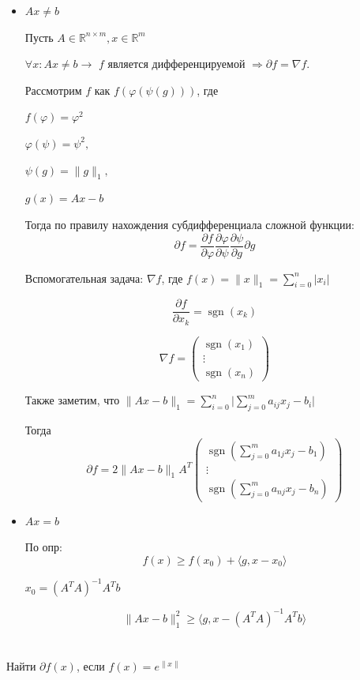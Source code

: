 \documentclass[a4paper,12pt]{article}
\DeclareMathOperator{\sgn}{\mathop{sgn}}
\newcommand{\lt}{\left}
\newcommand{\rt}{\right}
\newcommand{\p}{\partial}
\newcommand{\fr}{\frac}
\newcommand{\bb}{\mathbb}
\newcommand{\vp}{\varphi}
\begin{document}
\begin{itemize}
	
\item $Ax \neq b$

Пусть $A \in \bb R^{n\times m}, x \in \bb R^m$

$\forall x: Ax \neq b \rightarrow$ $f$ является дифференцируемой $\Rightarrow\p f = \nabla f$.

Рассмотрим $f$ как $f(\vp(\psi(g)))$, где 

$f(\vp) = \vp^2$

$\vp(\psi) = \psi^2,$
 
$\psi(g) = \|g\|_1,$ 

$g(x) = Ax-b$

Тогда по правилу нахождения субдифференциала сложной функции:
$$\p f = \fr{\p f}{\p \vp}\fr{\p \vp}{\p \psi}\fr{\p \psi}{\p g}\p g$$

Вспомогательная задача: $\nabla f$, где $f(x) = \|x\|_1 = \sum\limits_{i = 0}^{n}|x_i|$

$$\fr{\p f}{\p x_k} = \sgn(x_k) $$

$$\nabla f = \begin{pmatrix}
\sgn (x_1)\\
\vdots\\
\sgn(x_n)
\end{pmatrix} $$

Также заметим, что $\|Ax-b\|_1 = \sum\limits_{i = 0}^{n}\Big|\sum\limits_{j = 0}^{m}a_{ij}x_j - b_i\Big|$

Тогда $$\p f = 2\|Ax-b\|_1A^{T}
\begin{pmatrix}
\sgn\lt(\sum\limits_{j = 0}^{m}a_{1j}x_j - b_1\rt)\\
\vdots\\
\sgn\lt(\sum\limits_{j = 0}^{m}a_{nj}x_j - b_n\rt)
\end{pmatrix}$$

\item $Ax = b$

По опр:
$$f(x)\ge f(x_0) + \langle g, x - x_0\rangle$$

$x_0 = (A^TA)^{-1}A^Tb$

$$\|Ax - b\|_1^2 \ge \langle g, x - (A^TA)^{-1}A^Tb \rangle$$

\end{itemize}
\section{}

Найти $\partial f(x)$, если $f(x) = e^{\|x\|}$
\end{document}

